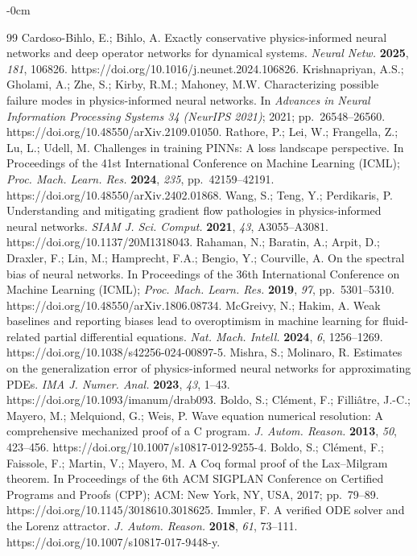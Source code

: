 \begin{adjustwidth}{-\extralength}{0cm}
\begin{thebibliography}{99}
 Cardoso-Bihlo, E.; Bihlo, A. Exactly conservative physics-informed neural networks and deep operator networks for dynamical systems. \textit{Neural Netw.} \textbf{2025}, \textit{181}, 106826. https://doi.org/10.1016/j.neunet.2024.106826.
 Krishnapriyan, A.S.; Gholami, A.; Zhe, S.; Kirby, R.M.; Mahoney, M.W. Characterizing possible failure modes in physics-informed neural networks. In \textit{Advances in Neural Information Processing Systems 34 (NeurIPS 2021)}; 2021; pp.\ 26548--26560. https://doi.org/10.48550/arXiv.2109.01050.
 Rathore, P.; Lei, W.; Frangella, Z.; Lu, L.; Udell, M. Challenges in training PINNs: A loss landscape perspective. In Proceedings of the 41st International Conference on Machine Learning (ICML); \textit{Proc. Mach. Learn. Res.} \textbf{2024}, \textit{235}, pp.\ 42159--42191. https://doi.org/10.48550/arXiv.2402.01868.
 Wang, S.; Teng, Y.; Perdikaris, P. Understanding and mitigating gradient flow pathologies in physics-informed neural networks. \textit{SIAM J. Sci. Comput.} \textbf{2021}, \textit{43}, A3055--A3081. https://doi.org/10.1137/20M1318043.
 Rahaman, N.; Baratin, A.; Arpit, D.; Draxler, F.; Lin, M.; Hamprecht, F.A.; Bengio, Y.; Courville, A. On the spectral bias of neural networks. In Proceedings of the 36th International Conference on Machine Learning (ICML); \textit{Proc. Mach. Learn. Res.} \textbf{2019}, \textit{97}, pp.\ 5301--5310. https://doi.org/10.48550/arXiv.1806.08734.
 McGreivy, N.; Hakim, A. Weak baselines and reporting biases lead to overoptimism in machine learning for fluid-related partial differential equations. \textit{Nat. Mach. Intell.} \textbf{2024}, \textit{6}, 1256--1269. https://doi.org/10.1038/s42256-024-00897-5.
 Mishra, S.; Molinaro, R. Estimates on the generalization error of physics-informed neural networks for approximating PDEs. \textit{IMA J. Numer. Anal.} \textbf{2023}, \textit{43}, 1--43. https://doi.org/10.1093/imanum/drab093.
 Boldo, S.; Cl\'ement, F.; Filli\^atre, J.-C.; Mayero, M.; Melquiond, G.; Weis, P. Wave equation numerical resolution: A comprehensive mechanized proof of a C program. \textit{J. Autom. Reason.} \textbf{2013}, \textit{50}, 423--456. https://doi.org/10.1007/s10817-012-9255-4.
 Boldo, S.; Cl\'ement, F.; Faissole, F.; Martin, V.; Mayero, M. A Coq formal proof of the Lax--Milgram theorem. In Proceedings of the 6th ACM SIGPLAN Conference on Certified Programs and Proofs (CPP); ACM: New York, NY, USA, 2017; pp.\ 79--89. https://doi.org/10.1145/3018610.3018625.
 Immler, F. A verified ODE solver and the Lorenz attractor. \textit{J. Autom. Reason.} \textbf{2018}, \textit{61}, 73--111. https://doi.org/10.1007/s10817-017-9448-y.
\end{thebibliography}
\end{adjustwidth}


